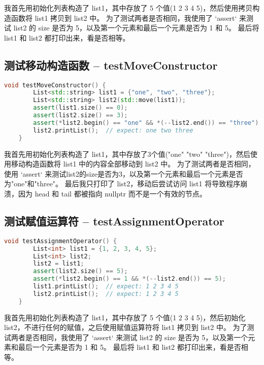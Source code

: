 \documentclass[UTF8]{ctexart}
\begin{document}
我首先用初始化列表构造了 list1，其中存放了 5 个值(1 2 3 4 5)，然后使用拷贝构造函数将 list1 拷贝到 list2 中。
为了测试两者是否相同，我使用了 `assert` 来测试 list2 的 size 是否为 5，以及第一个元素和最后一个元素是否为 1 和 5。
最后将 list1 和 list2 都打印出来，看是否相等。

\subsection{测试移动构造函数 -- testMoveConstructor}
\begin{lstlisting}[language=c++, breaklines=true, keywordstyle=\color{blue!70}, commentstyle=\color{red!50!green!50!blue!50}, frame=shadowbox, rulesepcolor=\color{red!20!green!20!blue!20}]
    void testMoveConstructor() {
        List<std::string> list1 = {"one", "two", "three"};
        List<std::string> list2(std::move(list1));
        assert(list1.size() == 0);
        assert(list2.size() == 3);
        assert(*list2.begin() == "one" && *(--list2.end()) == "three");
        list2.printList();  // expect: one two three
    }
\end{lstlisting}

我首先用初始化列表构造了 list1，其中存放了3个值("one" "two" "three")，然后使用移动构造函数将 list1 中的内容全部移动到 list2 中。
为了测试两者是否相同，使用 `assert` 来测试list2的size是否为3，以及第一个元素和最后一个元素是否为"one"和"three"。
最后我只打印了 list2，移动后尝试访问 list1 将导致程序崩溃，因为 head 和 tail 都被指向 nullptr 而不是一个有效的节点。

\subsection{测试赋值运算符 -- testAssignmentOperator}
\begin{lstlisting}[language=c++, breaklines=true, keywordstyle=\color{blue!70}, commentstyle=\color{red!50!green!50!blue!50}, frame=shadowbox, rulesepcolor=\color{red!20!green!20!blue!20}]
    void testAssignmentOperator() {
        List<int> list1 = {1, 2, 3, 4, 5};
        List<int> list2;
        list2 = list1;
        assert(list2.size() == 5);
        assert(*list2.begin() == 1 && *(--list2.end()) == 5);
        list1.printList();  // expect: 1 2 3 4 5
        list2.printList();  // expect: 1 2 3 4 5
    }
\end{lstlisting}

我首先用初始化列表构造了 list1，其中存放了 5 个值(1 2 3 4 5)，然后初始化 list2，不进行任何的赋值，之后使用赋值运算符将 list1 拷贝到 list2 中。
为了测试两者是否相同，我使用了 `assert` 来测试 list2 的 size 是否为 5，以及第一个元素和最后一个元素是否为 1 和 5。
最后将 list1 和 list2 都打印出来，看是否相等。
\end{document}
